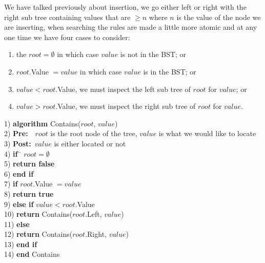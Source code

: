 We have talked previously about insertion, we go either left or right with the right sub tree containing values that are $\geq n$ where $n$ is the value of the node we are inserting, when searching the rules are made a little more atomic and at any one time we have four cases to consider: 
\begin{enumerate}
\item the $root = \emptyset$ in which case $value$ is not in the BST; or
\item $root$.Value $= value$ in which case $value$ is in the BST; or
\item $value < root$.Value, we must inspect the left sub tree of $root$ for $value$; or
\item $value > root$.Value, we must inspect the right sub tree of $root$ for $value$.
\end{enumerate}



\begin{tabbing}
1)  \textbf{alg}\= \textbf{orithm} Contains($root$, $value$) \\
2)  \> \textbf{Pre:}~~$root$ is the root node of the tree, $value$ is what we would like to locate \\
3)  \> \textbf{Post:}~$value$ is either located or not \\
4)  \> \textbf{if}~\= $root = \emptyset$ \\
5)  \> \> \textbf{return false} \\
6)  \> \textbf{end if} \\
7)  \> \textbf{if} $root$.Value $= value$ \\
8)  \> \> \textbf{return true} \\
9)  \> \textbf{else if} $value < root$.Value \\
10) \> \> \textbf{return} Contains($root$.Left, $value$) \\
11) \> \textbf{else} \\
12) \> \> \textbf{return} Contains($root$.Right, $value$) \\
13) \> \textbf{end if} \\
14) \textbf{end} Contains \\
\end{tabbing}

\newpage
